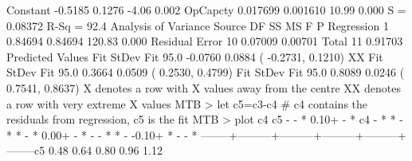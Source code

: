 \documentclass[a4paper,12pt]{article}
\begin{document}
Constant -0.5185 0.1276 -4.06 0.002
OpCapcty 0.017699 0.001610 10.99 0.000
S = 0.08372 R-Sq = 92.4%
Analysis of Variance
Source DF SS MS F P
Regression 1 0.84694 0.84694 120.83 0.000
Residual Error 10 0.07009 0.00701
Total 11 0.91703
Predicted Values
Fit StDev Fit 95.0%
-0.0760 0.0884 ( -0.2731, 0.1210) XX
Fit StDev Fit 95.0%
0.3664 0.0509 ( 0.2530, 0.4799)
Fit StDev Fit 95.0%
0.8089 0.0246 ( 0.7541, 0.8637)
X denotes a row with X values away from the centre
XX denotes a row with very extreme X values
MTB > let c5=c3-c4 # c4 contains the residuals from regression, c5 is the fit
MTB > plot c4 c5
-
- *
0.10+
- *
c4 - * *
- * *
- *
0.00+
- *
-
- * *
-
-0.10+ *
-
- *
--------+---------+---------+---------+---------+--------c5
0.48 0.64 0.80 0.96 1.12
\end{document}

